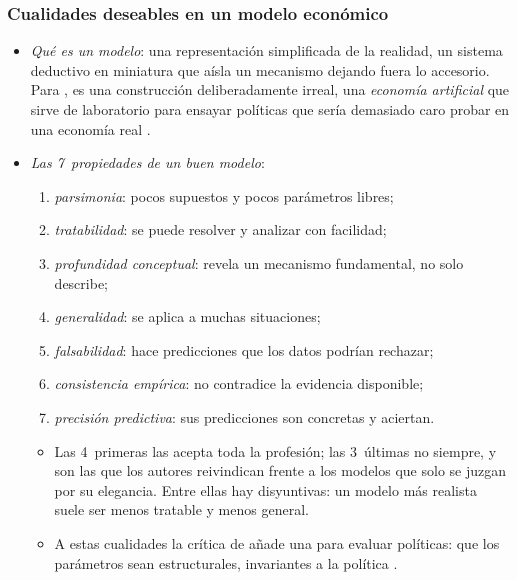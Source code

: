 \documentclass[11pt]{article}
\begin{document}
\subsubsection{Cualidades deseables en un modelo económico}\label{sec:cualidades}

\begin{itemize}
\item \emph{Qué es un modelo}: una representación simplificada de la realidad, un sistema deductivo en miniatura que aísla un mecanismo dejando fuera lo accesorio. Para \textcite{Lucas1980Methods}, es una construcción deliberadamente irreal, una \emph{economía artificial} que sirve de laboratorio para ensayar políticas que sería demasiado caro probar en una economía real .
\item \emph{Las 7~propiedades de un buen modelo}\nocite{GabaixLaibson2008Seven}:
  \begin{enumerate}
  \item \emph{parsimonia}: pocos supuestos y pocos parámetros libres;
  \item \emph{tratabilidad}: se puede resolver y analizar con facilidad;
  \item \emph{profundidad conceptual}: revela un mecanismo fundamental, no solo describe;
  \item \emph{generalidad}: se aplica a muchas situaciones;
  \item \emph{falsabilidad}: hace predicciones que los datos podrían rechazar;
  \item \emph{consistencia empírica}: no contradice la evidencia disponible;
  \item \emph{precisión predictiva}: sus predicciones son concretas y aciertan.
  \end{enumerate}
  \begin{itemize}
  \item Las 4~primeras las acepta toda la profesión; las 3~últimas no siempre, y son las que los autores reivindican frente a los modelos que solo se juzgan por su elegancia. Entre ellas hay disyuntivas: un modelo más realista suele ser menos tratable y menos general.
  \item A estas cualidades la crítica de  añade una para evaluar políticas: que los parámetros sean estructurales, invariantes a la política .
  \end{itemize}
\end{itemize}

\end{document}
